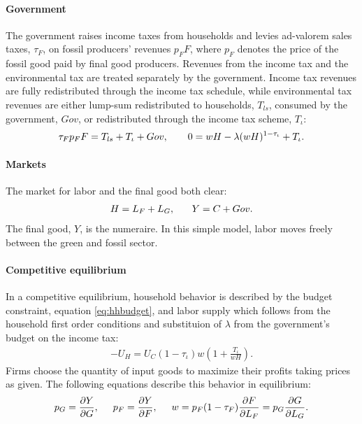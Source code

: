 \paragraph{Government}
The government raises income taxes from households and levies ad-valorem sales taxes, $\tau_F$, on fossil producers' revenues $p_FF$, where $p_F$ denotes the price of the fossil good paid by final good producers. Revenues from the income tax and the environmental tax are treated separately by the government. Income tax revenues are fully redistributed through the income tax schedule, while environmental tax revenues are either lump-sum redistributed to households, $T_{ls}$, consumed by the government, $Gov$, or redistributed through the income tax scheme, $T_\iota$:
\begin{align}
\tau_{F}p_FF=T_{ls}+T_\iota+Gov, \hspace{7mm}
0={w H}-\lambda(w H)^{1-\tau_{\iota}}+T_\iota. \label{eq:gov_but}
\end{align}

\paragraph{Markets}
The market for labor and the final good both clear: 
\begin{align}
H=L_F+L_G,\ \hspace{5mm} Y=C+Gov. \label{eq:market_clear}
\end{align}
 The final good, $Y$, is the numeraire. In this simple model, labor moves freely between the green and fossil sector. 
\paragraph{Competitive equilibrium}
In a competitive equilibrium, household behavior is described by the budget constraint, equation \ref{eq:hhbudget}, and labor supply which follows from the household first order conditions and substituion of $\lambda$ from the government's budget on the income tax:
\begin{align}
-U_H=U_C(1-\tau_{\iota})w\left(1+\frac{T_\iota}{wH}\right). \label{eq:hsup}
\end{align}
Firms choose the quantity of input goods to maximize their profits taking prices as given. The following equations describe this behavior in equilibrium:
\begin{align}
p_G=\frac{\partial Y}{\partial G}, \hspace{5mm}
p_F = \frac{\partial Y}{\partial F}, \hspace{5mm}
w= p_F(1-\tau_F)\frac{\partial F}{\partial L_F}=p_G\frac{\partial G}{\partial L_G}.\label{eq:profmax}
\end{align}

